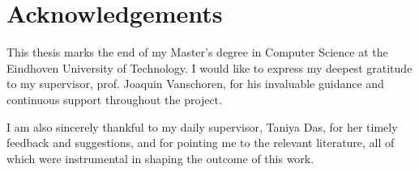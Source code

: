 \chapter*{Acknowledgements}

This thesis marks the end of my Master's degree in Computer Science at the Eindhoven University of Technology. I would like to express my deepest gratitude to my supervisor, prof. Joaquin Vanschoren, for his invaluable guidance and continuous support throughout the project. 

I am also sincerely thankful to my daily supervisor, Taniya Das, for her timely feedback and suggestions, and for pointing me to the relevant literature, all of which were instrumental in shaping the outcome of this work.